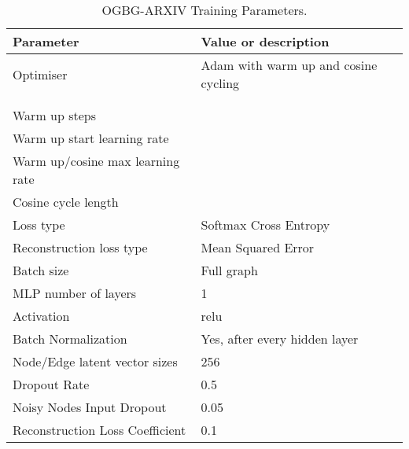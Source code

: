 \documentclass{article} \usepackage{iclr2022_conference,times}
\begin{document}
\begin{table}[]
\caption{OGBG-ARXIV Training Parameters.}
    \label{arxiv-params}
    \centering
    \begin{tabular}{ll}
      \toprule
       Parameter & Value or description \\
       \midrule
       Optimiser & Adam with warm up and cosine cycling \\
          &  \\              
          &  \\                     
       Warm up steps    &  \\
       Warm up start learning rate    &  \\       
       Warm up/cosine max learning rate    &  \\       
       Cosine cycle length    &  \\       
       Loss type & Softmax Cross Entropy \\
       Reconstruction loss type & Mean Squared Error \\
     \midrule
       Batch size & Full graph \\
     \midrule
       MLP number of layers & 1 \\
       Activation & relu \\
       Batch Normalization & Yes, after every hidden layer \\
       Node/Edge latent vector sizes & 256 \\ 
     \midrule
       Dropout Rate & 0.5 \\
       Noisy Nodes Input Dropout & 0.05 \\
       Reconstruction Loss Coefficient & 0.1 \\
    \bottomrule

\end{tabular}
\end{table}
\end{document}
